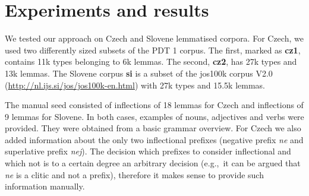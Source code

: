 \documentclass{itatnew}
\newcommand{\e}[1]{\textit{#1}} %
\newcommand{\eg}{e.g.,~}
\begin{document}
%
%

\section{Experiments and results}

We tested our approach on Czech and Slovene lemmatised corpora. For Czech, we used two differently sized subsets of the PDT 1 corpus. The first, marked as \textbf{cz1}, contains 11k types belonging to 6k lemmas. The second, \textbf{cz2}, has 27k types and 13k lemmas. The Slovene corpus \textbf{si} is a subset of the jos100k corpus V2.0 (\url{http://nl.ijs.si/jos/jos100k-en.html}) with 27k types and 15.5k lemmas.

The manual seed consisted of inflections of 18 lemmas for Czech and inflections of 9 lemmas for Slovene.  In both cases, examples of nouns, adjectives and verbs were provided. They were obtained from a basic grammar overview. For Czech we also added information about the only two inflectional prefixes (negative prefix \e{ne} and superlative prefix \e{nej}). The decision which prefixes to consider inflectional and which not is to a certain degree an arbitrary decision (\eg it can be argued that \e{ne} is a clitic and not a prefix), therefore it makes sense to provide such information manually.
\end{document}

